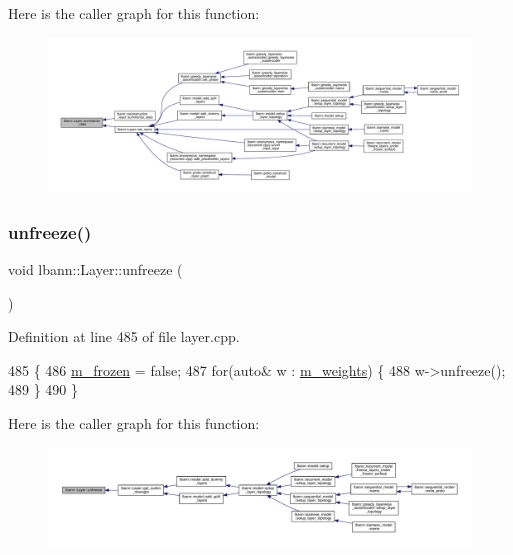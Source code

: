 Here is the caller graph for this function\+:\nopagebreak
\begin{figure}[H]
\begin{center}
\leavevmode
\includegraphics[width=350pt]{classlbann_1_1Layer_a7f3f26e2ae0497f9a00fd6bc56b50543_icgraph}
\end{center}
\end{figure}
\mbox{\label{classlbann_1_1Layer_aa43ecf9fc67eb1d596c1a69cf35d1245}} 
\subsubsection{\texorpdfstring{unfreeze()}{unfreeze()}}
{\footnotesize\ttfamily void lbann\+::\+Layer\+::unfreeze (\begin{DoxyParamCaption}{ }\end{DoxyParamCaption})}



Definition at line 485 of file layer.\+cpp.


\begin{DoxyCode}
485                      \{
486   \hyperlink{classlbann_1_1Layer_afdc60df9731a3ecdeeeb8175fa483676}{m\_frozen} = \textcolor{keyword}{false};
487   \textcolor{keywordflow}{for}(\textcolor{keyword}{auto}& w : \hyperlink{classlbann_1_1Layer_a7954e30fbf9100a6ba4b56d02767a469}{m\_weights}) \{
488     w->unfreeze();
489   \}
490 \}
\end{DoxyCode}
Here is the caller graph for this function\+:\nopagebreak
\begin{figure}[H]
\begin{center}
\leavevmode
\includegraphics[width=350pt]{classlbann_1_1Layer_aa43ecf9fc67eb1d596c1a69cf35d1245_icgraph}
\end{center}
\end{figure}
\mbox{\label{classlbann_1_1Layer_ae4a050e51e3a9bec431cf8b7a5660f2c}} 

